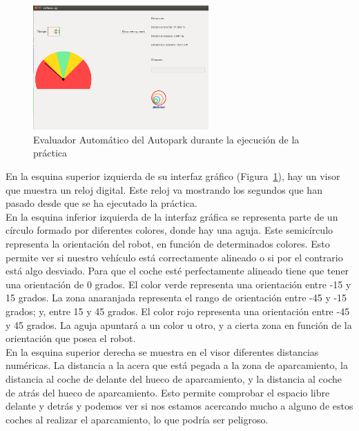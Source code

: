\begin{figure}[H]
  \begin{center}
    \includegraphics[width=0.6\textwidth]{figures/Autopark/Referee_DurantePractica.png}
		\caption{Evaluador Automático del Autopark durante la ejecución de la práctica}
		\label{fig.Referee_DurantePractica}
		\end{center}
\end{figure}


En la esquina superior izquierda de su interfaz gráfico (Figura~\ref{fig.Referee_DurantePractica}), hay un visor que muestra un reloj digital. Este reloj va mostrando los segundos que han pasado desde que se ha ejecutado la práctica.\\

En la esquina inferior izquierda de la interfaz gráfica se representa parte de un círculo formado por diferentes colores, donde hay una aguja. Este semicírculo representa la orientación del robot, en función de determinados colores. Esto permite ver si nuestro vehículo está correctamente alineado o si por el contrario está algo desviado. Para que el coche esté perfectamente alineado tiene que tener una orientación de 0 grados. El color verde representa una orientación entre -15 y 15 grados. La zona anaranjada representa el rango de orientación entre -45 y -15 grados; y, entre 15 y 45 grados. El color rojo representa una orientación entre -45 y 45 grados. La aguja apuntará a un color u otro, y a cierta zona en función de la orientación que posea el robot.\\

En la esquina superior derecha se muestra en el visor diferentes distancias numéricas. La distancia a la acera que está pegada a la zona de aparcamiento, la distancia al coche de delante del hueco de aparcamiento, y la distancia al coche de atrás del hueco de aparcamiento. Esto permite comprobar el espacio libre delante y detrás y podemos ver si nos estamos acercando mucho a alguno de estos coches al realizar el aparcamiento, lo que podría ser peligroso.\\

